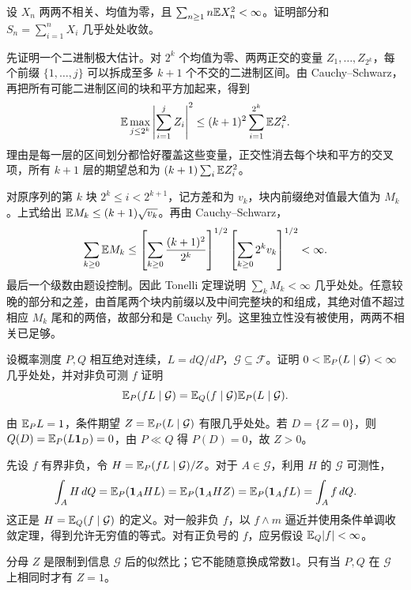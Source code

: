 \begin{example}[原题2：正交随机级数的一个充分条件]\label{yau:2014-2}
设 $X_n$ 两两不相关、均值为零，且 $\sum_{n\ge1}n\mathbb E X_n^2<\infty$。证明部分和 $S_n=\sum_{i=1}^nX_i$ 几乎处处收敛。
\end{example}
\begin{solve}
先证明一个二进制极大估计。对 $2^k$ 个均值为零、两两正交的变量 $Z_1,\ldots,Z_{2^k}$，每个前缀 $\{1,\ldots,j\}$ 可以拆成至多 $k+1$ 个不交的二进制区间。由 Cauchy--Schwarz，再把所有可能二进制区间的块和平方加起来，得到
\[
\mathbb E\max_{j\le2^k}\left|\sum_{i=1}^j Z_i\right|^2\le(k+1)^2\sum_{i=1}^{2^k}\mathbb E Z_i^2.
\]
理由是每一层的区间划分都恰好覆盖这些变量，正交性消去每个块和平方的交叉项，所有 $k+1$ 层的期望总和为 $(k+1)\sum_i\mathbb E Z_i^2$。

对原序列的第 $k$ 块 $2^k\le i<2^{k+1}$，记方差和为 $v_k$，块内前缀绝对值最大值为 $M_k$。上式给出 $\mathbb E M_k\le(k+1)\sqrt{v_k}$。再由 Cauchy--Schwarz，
\[
\sum_{k\ge0}\mathbb E M_k\le
\left[\sum_{k\ge0}\frac{(k+1)^2}{2^k}\right]^{1/2}
\left[\sum_{k\ge0}2^kv_k\right]^{1/2}<\infty.
\]
最后一个级数由题设控制。因此 Tonelli 定理说明 $\sum_kM_k<\infty$ 几乎处处。任意较晚的部分和之差，由首尾两个块内前缀以及中间完整块的和组成，其绝对值不超过相应 $M_k$ 尾和的两倍，故部分和是 Cauchy 列。这里独立性没有被使用，两两不相关已足够。
\end{solve}

\begin{example}[原题3：改变测度后的条件期望]\label{yau:2014-3}
设概率测度 $P,Q$ 相互绝对连续，$L=dQ/dP$，$\mathcal G\subseteq\mathcal F$。证明 $0<\mathbb E_P(L\mid\mathcal G)<\infty$ 几乎处处，并对非负可测 $f$ 证明
\[
\mathbb E_P(fL\mid\mathcal G)=\mathbb E_Q(f\mid\mathcal G)\mathbb E_P(L\mid\mathcal G).
\]
\end{example}
\begin{solve}
由 $\mathbb E_PL=1$，条件期望 $Z=\mathbb E_P(L\mid\mathcal G)$ 有限几乎处处。若 $D=\{Z=0\}$，则 $Q(D)=\mathbb E_P(L\mathbf1_D)=0$，由 $P\ll Q$ 得 $P(D)=0$，故 $Z>0$。

先设 $f$ 有界非负，令 $H=\mathbb E_P(fL\mid\mathcal G)/Z$。对于 $A\in\mathcal G$，利用 $H$ 的 $\mathcal G$ 可测性，
\[
\int_AH\,dQ=\mathbb E_P(\mathbf1_AHL)=\mathbb E_P(\mathbf1_AHZ)=\mathbb E_P(\mathbf1_AfL)=\int_Af\,dQ.
\]
这正是 $H=\mathbb E_Q(f\mid\mathcal G)$ 的定义。对一般非负 $f$，以 $f\wedge m$ 逼近并使用条件单调收敛定理，得到允许无穷值的等式。对有正负号的 $f$，应另假设 $\mathbb E_Q|f|<\infty$。

分母 $Z$ 是限制到信息 $\mathcal G$ 后的似然比；它不能随意换成常数1。只有当 $P,Q$ 在 $\mathcal G$ 上相同时才有 $Z=1$。
\end{solve}

